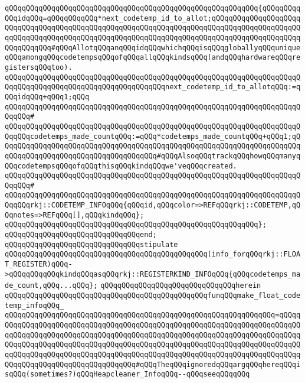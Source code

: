 \verb|qQQqqQQqqQQqqQQqqQQqqQQqqQQqqQQqqQQqqQQqqQQqqQQqqQQqqQQqqQQq{qQQqqQQqqQQqidqQQq=qQQqqQQqqQQq*next_codetemp_id_to_allot;qQQqqQQqqQQqqQQqqQQqqQQqqQQqqQQqqQQqqQQqqQQqqQQqqQQqqQQqqQQqqQQqqQQqqQQqqQQqqQQqqQQqqQQqqQQqqQQqqQQqqQQqqQQqqQQqqQQqqQQqqQQqqQQqqQQqqQQqqQQqqQQqqQQqqQQqqQQqqQQqqQQqqQQqqQQq#qQQqAllotqQQqanqQQqidqQQqwhichqQQqisqQQqgloballyqQQquniqueqQQqamongqQQqcodetempsqQQqofqQQqallqQQqkindsqQQq(andqQQqhardwareqQQqregistersqQQqtoo).|\newline
\verb|qQQqqQQqqQQqqQQqqQQqqQQqqQQqqQQqqQQqqQQqqQQqqQQqqQQqqQQqqQQqqQQqqQQqqQQqqQQqqQQqqQQqqQQqqQQqqQQqqQQqqQQqqQQqnext_codetemp_id_to_allotqQQq:=qQQqidqQQq+qQQq1;qQQq|\newline
\verb|qQQqqQQqqQQqqQQqqQQqqQQqqQQqqQQqqQQqqQQqqQQqqQQqqQQqqQQqqQQqqQQqqQQqqQQqqQQq#|\newline
\verb|qQQqqQQqqQQqqQQqqQQqqQQqqQQqqQQqqQQqqQQqqQQqqQQqqQQqqQQqqQQqqQQqqQQqqQQqqQQqcodetemps_made_countqQQq:=qQQq*codetemps_made_countqQQq+qQQq1;qQQqqQQqqQQqqQQqqQQqqQQqqQQqqQQqqQQqqQQqqQQqqQQqqQQqqQQqqQQqqQQqqQQqqQQqqQQqqQQqqQQqqQQqqQQqqQQqqQQqqQQqqQQq#qQQqAlsoqQQqtrackqQQqhowqQQqmanyqQQqcodetempsqQQqofqQQqthisqQQqkindqQQqwe'veqQQqcreated.|\newline
\verb|qQQqqQQqqQQqqQQqqQQqqQQqqQQqqQQqqQQqqQQqqQQqqQQqqQQqqQQqqQQqqQQqqQQqqQQqqQQq#|\newline
\verb|qQQqqQQqqQQqqQQqqQQqqQQqqQQqqQQqqQQqqQQqqQQqqQQqqQQqqQQqqQQqqQQqqQQqqQQqqQQqrkj::CODETEMP_INFOqQQq{qQQqid,qQQqcolor=>REFqQQqrkj::CODETEMP,qQQqnotes=>REFqQQq[],qQQqkindqQQq};|\newline
\verb|qQQqqQQqqQQqqQQqqQQqqQQqqQQqqQQqqQQqqQQqqQQqqQQqqQQqqQQqqQQq};|\newline
\verb|qQQqqQQqqQQqqQQqqQQqqQQqqQQqqQQqend;|\newline
\newline
\verb|qQQqqQQqqQQqqQQqqQQqqQQqqQQqqQQqstipulate|\newline
\verb|qQQqqQQqqQQqqQQqqQQqqQQqqQQqqQQqqQQqqQQqqQQqqQQq(info_forqQQqrkj::FLOAT_REGISTER)qQQq->qQQqqQQqqQQqkindqQQqasqQQqrkj::REGISTERKIND_INFOqQQq{qQQqcodetemps_made_count,qQQq...qQQq};|\newline
\verb|qQQqqQQqqQQqqQQqqQQqqQQqqQQqqQQqherein|\newline
\verb|qQQqqQQqqQQqqQQqqQQqqQQqqQQqqQQqqQQqqQQqqQQqqQQqfunqQQqmake_float_codetemp_infoqQQq_|\newline
\verb|qQQqqQQqqQQqqQQqqQQqqQQqqQQqqQQqqQQqqQQqqQQqqQQqqQQqqQQqqQQqqQQq=qQQqqQQqqQQqqQQqqQQqqQQqqQQqqQQqqQQqqQQqqQQqqQQqqQQqqQQqqQQqqQQqqQQqqQQqqQQqqQQqqQQqqQQqqQQqqQQqqQQqqQQqqQQqqQQqqQQqqQQqqQQqqQQqqQQqqQQqqQQqqQQqqQQqqQQqqQQqqQQqqQQqqQQqqQQqqQQqqQQqqQQqqQQqqQQqqQQqqQQqqQQqqQQqqQQqqQQqqQQqqQQqqQQqqQQqqQQqqQQqqQQqqQQqqQQqqQQqqQQqqQQqqQQqqQQqqQQqqQQqqQQqqQQqqQQqqQQqqQQqqQQqqQQqqQQqqQQq#qQQqTheqQQqignoredqQQqargqQQqhereqQQqisqQQq(sometimes?)qQQqHeapcleaner_InfoqQQq--qQQqseeqQQqqQQq|\newline
